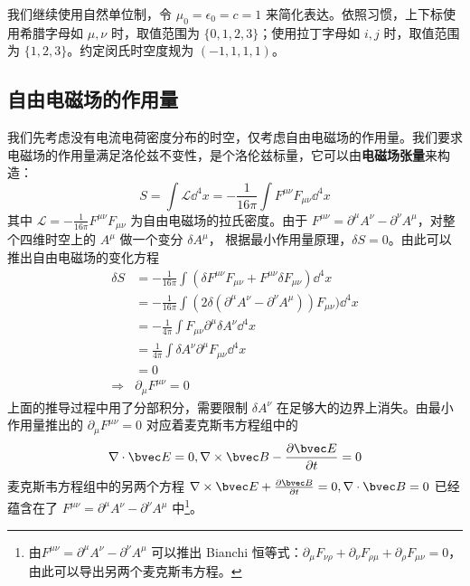 

我们继续使用自然单位制，令 $\mu_0=\epsilon_0=c=1$ 来简化表达。依照习惯，上下标使用希腊字母如 $\mu, \nu$ 时，取值范围为 $\{0, 1, 2, 3\}$；使用拉丁字母如 $i, j$ 时，取值范围为 $\{1, 2, 3\}$。约定闵氏时空度规为 $(-1,1,1,1)$。

\subsection{自由电磁场的作用量}
我们先考虑没有电流电荷密度分布的时空，仅考虑自由电磁场的作用量。我们要求电磁场的作用量满足洛伦兹不变性，是个洛伦兹标量，它可以由\textbf{电磁场张量}来构造：
\begin{equation}\label{ElecS_eq1}
S=\int {\mathcal L} {\dd}^4 x=-\frac{1}{16\pi}\int F^{\mu\nu}F_{\mu\nu}{\dd}^4 x 
\end{equation}
其中 $\mathcal L=-\frac{1}{16\pi}F^{\mu\nu}F_{\mu\nu}$ 为自由电磁场的拉氏密度。由于 $F^{\mu\nu}=\partial^\mu A^\nu -\partial^\nu A^\mu$，对整个四维时空上的 $A^\mu$ 做一个变分 $\delta A^\mu$，
根据最小作用量原理，$\delta S=0$。由此可以推出自由电磁场的变化方程
\begin{equation}
\begin{aligned}
\delta S&=-\frac{1}{16\pi}\int (\delta F^{\mu\nu}F_{\mu\nu}+F^{\mu\nu}\delta F_{\mu\nu}){\dd}^4 x\\
&=-\frac{1}{16\pi}\int (2\delta (\partial^\mu A^\nu-\partial^\nu A^\mu)) F_{\mu\nu}){\dd}^4 x\\
&=-\frac{1}{4\pi}\int F_{\mu\nu}\partial^\mu \delta A^\nu {\dd}^4 x\\
&=\frac{1}{4\pi}\int \delta A^\nu\partial^\mu F_{\mu\nu} {\dd}^4 x \\
&=0\\
\Rightarrow &\partial_\mu F^{\mu\nu}=0
\end{aligned}
\end{equation}
上面的推导过程中用了分部积分，需要限制 $\delta A^\nu$ 在足够大的边界上消失。由最小作用量推出的 $\partial_\mu F^{\mu\nu}=0$ 对应着麦克斯韦方程组中的
\begin{equation}
\nabla\cdot \bvec E=0,\nabla\times \bvec B-\frac{\partial \bvec E}{\partial t}=0
\end{equation}
麦克斯韦方程组中的另两个方程 $\nabla\times \bvec E+\frac{\partial \bvec B}{\partial t}=0,\nabla\cdot \bvec B=0$ 已经蕴含在了 $F^{\mu\nu}=\partial^\mu A^\nu-\partial^\nu A^\mu$ 中\footnote{由$F^{\mu\nu}=\partial^\mu A^\nu-\partial^\nu A^\mu$ 可以推出 Bianchi 恒等式：$\partial_{\mu}F_{\nu\rho}+\partial_{\nu}F_{\rho\mu}+\partial_{\rho}F_{\mu\nu}=0$，由此可以导出另两个麦克斯韦方程。}。

